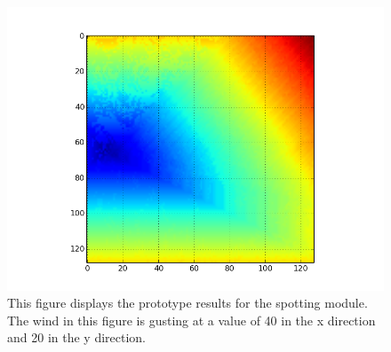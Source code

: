 \begin{figure}%
\centering
  \includegraphics[height=.4\textheight]{figures/results/spot_40_40.png}
  \caption{This figure displays the prototype results for the spotting module. The wind in this figure is gusting at a value of 40 in the x direction and 20 in the y direction.}
  \label{fig:spot_40_20}
\end{figure} 


